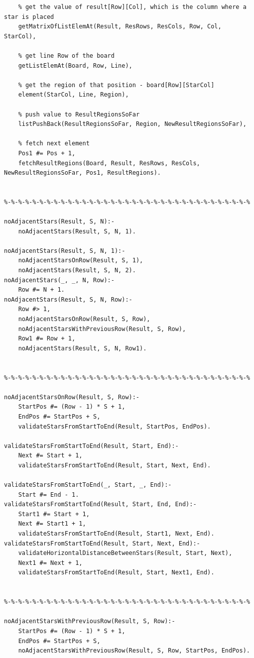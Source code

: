 \documentclass[runningheads,a4paper]{llncs}
\begin{document}
\begin{changemargin}{-3cm}{-4cm}
\begin{verbatim}
    % get the value of result[Row][Col], which is the column where a star is placed
    getMatrixOfListElemAt(Result, ResRows, ResCols, Row, Col, StarCol),

    % get line Row of the board
    getListElemAt(Board, Row, Line),

    % get the region of that position - board[Row][StarCol]
    element(StarCol, Line, Region),

    % push value to ResultRegionsSoFar
    listPushBack(ResultRegionsSoFar, Region, NewResultRegionsSoFar),

    % fetch next element
    Pos1 #= Pos + 1,
    fetchResultRegions(Board, Result, ResRows, ResCols, NewResultRegionsSoFar, Pos1, ResultRegions).


%-%-%-%-%-%-%-%-%-%-%-%-%-%-%-%-%-%-%-%-%-%-%-%-%-%-%-%-%-%-%-%-%-%-%

noAdjacentStars(Result, S, N):-
    noAdjacentStars(Result, S, N, 1).

noAdjacentStars(Result, S, N, 1):-
    noAdjacentStarsOnRow(Result, S, 1),
    noAdjacentStars(Result, S, N, 2).
noAdjacentStars(_, _, N, Row):-
    Row #= N + 1.
noAdjacentStars(Result, S, N, Row):-
    Row #> 1,
    noAdjacentStarsOnRow(Result, S, Row),
    noAdjacentStarsWithPreviousRow(Result, S, Row),
    Row1 #= Row + 1,
    noAdjacentStars(Result, S, N, Row1).


%-%-%-%-%-%-%-%-%-%-%-%-%-%-%-%-%-%-%-%-%-%-%-%-%-%-%-%-%-%-%-%-%-%-%

noAdjacentStarsOnRow(Result, S, Row):-
    StartPos #= (Row - 1) * S + 1,
    EndPos #= StartPos + S,
    validateStarsFromStartToEnd(Result, StartPos, EndPos).

validateStarsFromStartToEnd(Result, Start, End):-
    Next #= Start + 1,
    validateStarsFromStartToEnd(Result, Start, Next, End).

validateStarsFromStartToEnd(_, Start, _, End):-
    Start #= End - 1.
validateStarsFromStartToEnd(Result, Start, End, End):-
    Start1 #= Start + 1,
    Next #= Start1 + 1,
    validateStarsFromStartToEnd(Result, Start1, Next, End).
validateStarsFromStartToEnd(Result, Start, Next, End):-
    validateHorizontalDistanceBetweenStars(Result, Start, Next),
    Next1 #= Next + 1,
    validateStarsFromStartToEnd(Result, Start, Next1, End).


%-%-%-%-%-%-%-%-%-%-%-%-%-%-%-%-%-%-%-%-%-%-%-%-%-%-%-%-%-%-%-%-%-%-%

noAdjacentStarsWithPreviousRow(Result, S, Row):-
    StartPos #= (Row - 1) * S + 1,
    EndPos #= StartPos + S,
    noAdjacentStarsWithPreviousRow(Result, S, Row, StartPos, EndPos).


\end{verbatim}
\end{changemargin}
\end{document}
